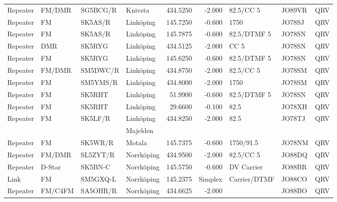 \begin{landscape}
\begin{longtable}{llllrrlll}
Repeater & FM/DMR     & SG5BCG/R & Knivsta           & 434.5250     & -2.000     & 82.5/CC 5       & JO89VR      & QRV      \\
Repeater & FM         & SK5AS/R  & Linköping         & 145.7250     & -0.600     & 1750            & JO78SJ      & QRV      \\
Repeater & FM         & SK5AS/R  & Linköping         & 145.7875     & -0.600     & 82.5/DTMF 5     & JO78SN      & QRV      \\
Repeater & DMR        & SK5RYG   & Linköping         & 434.5125     & -2.000     & CC 5            & JO78SN      & QRV      \\
Repeater & FM         & SK5RYG   & Linköping         & 145.6250     & -0.600     & 82.5/DTMF 5     & JO78SN      & QRV      \\
Repeater & FM/DMR     & SM5DWC/R & Linköping         & 434.8750     & -2.000     & 82.5/CC 5       & JO78SM      & QRV      \\
Repeater & FM         & SM5YMS/R & Linköping         & 434.8000     & -2.000     & 1750            & JO78SM      & QRV      \\
Repeater & FM         & SK5RHT   & Linköping         & 51.9900      & -0.600     & 82.5/DTMF 5     & JO78SN      & QRV      \\
Repeater & FM         & SK5RHT   & Linköping         & 29.6600      & -0.100     & 82.5            & JO78XH      & QRV      \\
Repeater & FM         & SK5LF/R  & Linköping         & 434.8250     & -2.000     & 82.5            & JO78TJ      & QRV      \\
         &            &          & Majelden          &              &            &                 &             &          \\
Repeater & FM         & SK5WR/R  & Motala            & 145.7375     & -0.600     & 1750/91.5       & JO78NM      & QRV      \\
Repeater & FM/DMR     & SL5ZYT/R & Norrköping        & 434.9500     & -2.000     & 82.5/CC 5       & JO88DQ      & QRV      \\
Repeater & D-Star     & SK5BN-C  & Norrköping        & 145.5750     & -0.600     & DV Carrier      & JO88BR      & QRV      \\
Link     & FM         & SM5GXQ-L & Norrköping        & 145.2375     & Simplex    & Carrier/DTMF    & JO88CO      & QRV      \\
Repeater & FM/C4FM    & SA5OHR/R & Norrköping        & 434.6625     & -2.000     &                 & JO88BO      & QRV      \\

\end{longtable}
\end{landscape}
